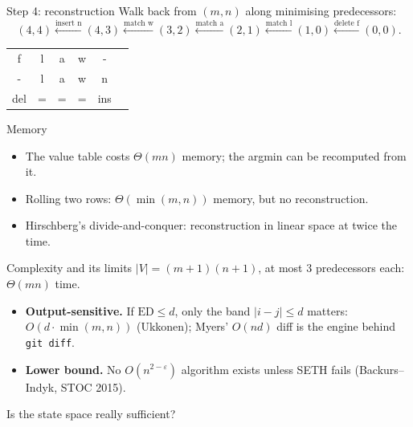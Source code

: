 \begin{frame}{Step 4: reconstruction}
	Walk back from $(m,n)$ along minimising predecessors:
	\[
		(4,4)\xleftarrow{\text{insert n}}(4,3)\xleftarrow{\text{match w}}(3,2)\xleftarrow{\text{match a}}(2,1)\xleftarrow{\text{match l}}(1,0)\xleftarrow{\text{delete f}}(0,0).
	\]
	\begin{center}
		\ttfamily
		\begin{tabular}{@{}cccccc@{}}
			f & l & a & w & - \\
			- & l & a & w & n \\
			\textrm{del} & = & = & = & \textrm{ins}
		\end{tabular}
	\end{center}
\end{frame}

\begin{frame}{Memory}
	\begin{itemize}
		\item The value table costs $\Theta(mn)$ memory; the argmin can be recomputed from it.
		\item Rolling two rows: $\Theta(\min(m,n))$ memory, but no reconstruction.
		\item \alert{Hirschberg's divide-and-conquer}: reconstruction in linear space at twice the time.
	\end{itemize}
\end{frame}

\begin{frame}{Complexity and its limits}
	$|V|=(m+1)(n+1)$, at most $3$ predecessors each: $\Theta(mn)$ time.

	\begin{itemize}
		\item \textbf{Output-sensitive.} If $\mathrm{ED}\le d$, only the band $|i-j|\le d$ matters:
		$O(d\cdot\min(m,n))$ (Ukkonen); Myers' $O(nd)$ diff is the engine behind \texttt{git diff}.
		\item \textbf{Lower bound.} No $O(n^{2-\varepsilon})$ algorithm exists unless SETH
		fails (Backurs--Indyk, STOC 2015).
	\end{itemize}
\end{frame}

\begin{frame}{Is the state space really sufficient?}
\end{frame}

